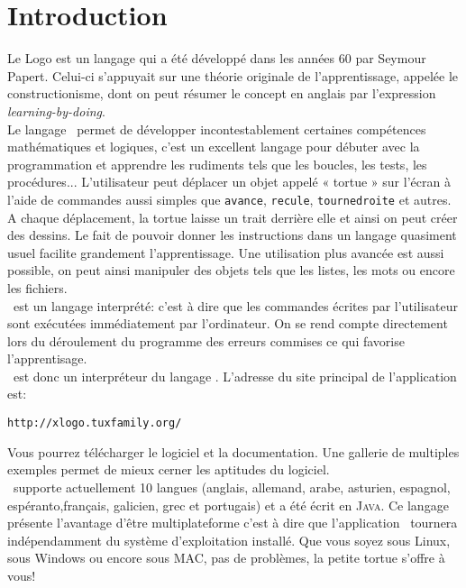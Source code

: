 \chapter*{Introduction}
Le Logo est un langage qui a été développé dans les années 60 par Seymour Papert. Celui-ci s'appuyait sur une théorie originale de l'apprentissage, appelée le constructionisme, dont on peut résumer le concept en anglais par l'expression \og \textit{learning-by-doing}\fg. \\

  Le langage \logo\ permet de développer incontestablement certaines compétences mathématiques et logiques, c'est un excellent langage pour débuter avec la programmation et apprendre les rudiments tels que les boucles, les tests, les procédures...  L'utilisateur peut déplacer un objet appelé « tortue » sur l'écran à l'aide de commandes aussi simples que \texttt{avance}, \texttt{recule}, \texttt{tournedroite} et autres. A chaque déplacement, la tortue laisse un trait derrière elle et ainsi on peut créer des dessins. Le fait de pouvoir donner les instructions dans un langage quasiment usuel facilite grandement l'apprentissage. Une utilisation plus avancée est aussi possible, on peut ainsi manipuler des objets tels que les listes, les mots ou encore les fichiers.\\

\logo\ est un langage interprété: c'est à dire que les commandes écrites par l'utilisateur sont exécutées immédiatement par l'ordinateur. On se rend compte directement lors du déroulement du programme des erreurs commises ce qui favorise l'apprentisage.\\

\xlogo\ est donc un interpréteur du langage \logo. L'adresse du site principal de l'application est:
\begin{center}
\texttt{http://xlogo.tuxfamily.org/}
\end{center}
Vous pourrez télécharger le logiciel et la documentation. Une gallerie de multiples exemples permet de mieux cerner les aptitudes du logiciel.\\

\xlogo\ supporte actuellement 10 langues (anglais, allemand, arabe, asturien, espagnol, espéranto,français, galicien, grec et portugais) et a été écrit en \textsc{Java}. Ce langage présente l'avantage d'être multiplateforme c'est à dire que l'application \xlogo\ tournera indépendamment du système d'exploitation installé. Que vous soyez sous Linux, sous Windows ou encore sous MAC, pas de problèmes, la petite tortue s'offre à vous!\\

